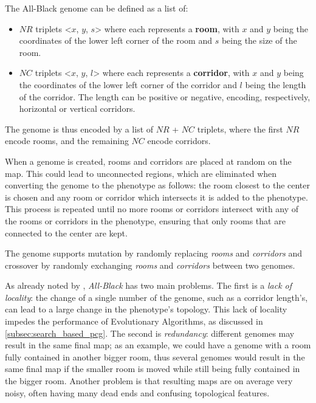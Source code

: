 The All-Black genome can be defined as a list of:
\begin{itemize}
    \item $NR$ triplets <$x$, $y$, $s$> where each represents a \textbf{room}, with $x$ and $y$ being the coordinates of the lower left corner of the room and $s$ being the size of the room.
    \item $NC$ triplets <$x$, $y$, $l$> where each represents a \textbf{corridor}, with $x$ and $y$ being the coordinates of the lower left corner of the corridor and $l$ being the length of the corridor. The length can be positive or negative, encoding, respectively, horizontal or vertical corridors.
\end{itemize}
The genome is thus encoded by a list of $NR$ + $NC$ triplets, where the first $NR$ encode rooms, and the remaining $NC$ encode corridors.

When a genome is created, rooms and corridors are placed at random on the map. This could lead to unconnected regions, which are eliminated when converting the genome to the phenotype as follows: the room closest to the center is chosen and any room or corridor which intersects it is added to the phenotype. This process is repeated until no more rooms or corridors intersect with any of the rooms or corridors in the phenotype, ensuring that only rooms that are connected to the center are kept.

The genome supports mutation by randomly replacing \textit{rooms} and \textit{corridors} and crossover by randomly exchanging \textit{rooms} and \textit{corridors} between two genomes.

As already noted by \citeauthor{bari_evolutionary-based_2023}, \textit{All-Black} has two main problems. The first is a \textit{lack of locality}: the change of a single number of the genome, such as a corridor length's, can lead to a large change in the phenotype's topology. This lack of locality impedes the performance of Evolutionary Algorithms, as discussed in \cref{subsec:search_based_pcg}. The second is \textit{redundancy}: different genomes may result in the same final map; as an example, we could have a genome with a room fully contained in another bigger room, thus several genomes would result in the same final map if the smaller room is moved while still being fully contained in the bigger room. Another problem is that resulting maps are on average very noisy, often having many dead ends and confusing topological features.

